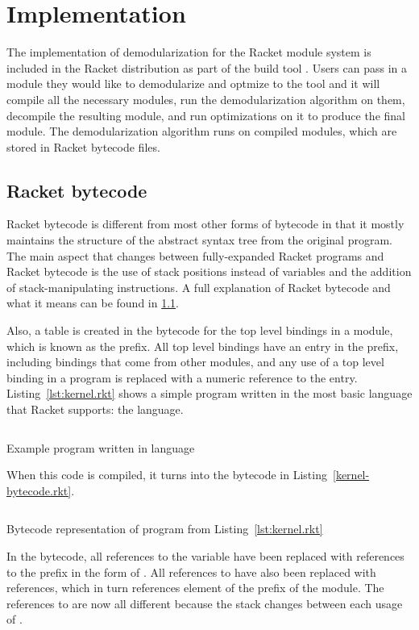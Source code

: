 \chapter{Implementation}

The implementation of demodularization for the Racket module system is included in the Racket distribution as part of the build tool . 
Users can pass in a module they would like to demodularize and optmize to the tool and it will compile all the necessary modules, run the demodularization algorithm on them, decompile the resulting module, and run optimizations on it to produce the final module.
The demodularization algorithm runs on compiled modules, which are stored in Racket bytecode files.

\section{Racket bytecode}
Racket bytecode is different from most other forms of bytecode in that it mostly maintains the structure of the abstract syntax tree from the original program.
The main aspect that changes between fully-expanded Racket programs and Racket bytecode is the use of stack positions instead of variables and the addition of stack-manipulating instructions.
A full explanation of Racket bytecode and what it means can be found in \ref{}.

Also, a table is created in the bytecode for the top level bindings in a module, which is known as the prefix.
All top level bindings have an entry in the prefix, including bindings that come from other modules, and any use of a top level binding in a program is replaced with a numeric reference to the entry.
Listing~\ref{lst:kernel.rkt} shows a simple program written in the most basic language that Racket supports: the  language.
\begin{listing}
  \inputminted{racket}{listings/kernel.rkt}
  \caption{Example program written in  language}
  \label{lst:kernel.rkt}
\end{listing}
When this code is compiled, it turns into the bytecode in Listing~\ref{kernel-bytecode.rkt}. 
\begin{listing}
  \inputminted{racket}{listings/kernel-bytecode.rkt}
  \caption{Bytecode representation of program from Listing~\ref{lst:kernel.rkt}}
  \label{lst:kernel-bytecode.rkt}
\end{listing}

In the bytecode, all references to the variable  have been replaced with references to the prefix in the form of . 
All references to  have also been replaced with  references, which in turn references element  of the prefix of the  module.
The references to  are now all different because the stack changes between each usage of .

